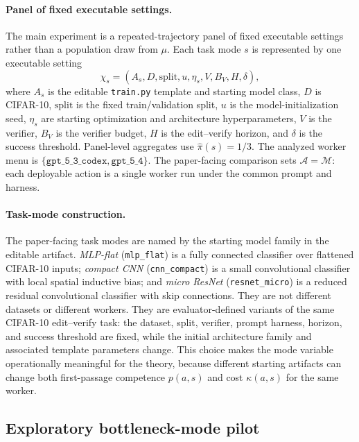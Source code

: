 \documentclass{article}
\newcommand{\cA}{\mathcal{A}}
\newcommand{\cM}{\mathcal{M}}
\begin{document}
\paragraph{Panel of fixed executable settings.}
The main experiment is a repeated-trajectory panel of fixed executable settings rather than a population draw from \(\mu\).
Each task mode \(s\) is represented by one executable setting
\[
\chi_s=(A_s,D,\mathrm{split},u,\eta_s,V,B_V,H,\delta),
\]
where \(A_s\) is the editable \texttt{train.py} template and starting model class, \(D\) is CIFAR-10, \(\mathrm{split}\) is the fixed train/validation split, \(u\) is the model-initialization seed, \(\eta_s\) are starting optimization and architecture hyperparameters, \(V\) is the verifier, \(B_V\) is the verifier budget, \(H\) is the edit--verify horizon, and \(\delta\) is the success threshold.
Panel-level aggregates use \(\hat\pi(s)=1/3\).
The analyzed worker menu is \(\{\texttt{gpt\_5\_3\_codex},\texttt{gpt\_5\_4}\}\).
The paper-facing comparison sets \(\cA=\cM\): each deployable action is a single worker run under the common prompt and harness.

\paragraph{Task-mode construction.}
The paper-facing task modes are named by the starting model family in the editable artifact.
\textit{MLP-flat} (\texttt{mlp\_flat}) is a fully connected classifier over flattened CIFAR-10 inputs; \textit{compact CNN} (\texttt{cnn\_compact}) is a small convolutional classifier with local spatial inductive bias; and \textit{micro ResNet} (\texttt{resnet\_micro}) is a reduced residual convolutional classifier with skip connections.
They are not different datasets or different workers.
They are evaluator-defined variants of the same CIFAR-10 edit--verify task: the dataset, split, verifier, prompt harness, horizon, and success threshold are fixed, while the initial architecture family and associated template parameters change.
This choice makes the mode variable operationally meaningful for the theory, because different starting artifacts can change both first-passage competence \(p(a,s)\) and cost \(\kappa(a,s)\) for the same worker.

\subsection{Exploratory bottleneck-mode pilot}
\label{app:exploratory-bottleneck-pilot}
\end{document}
